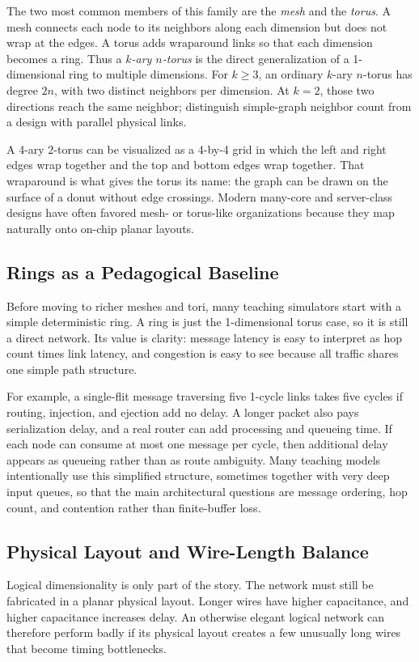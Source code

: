 The two most common members of this family are the \textit{mesh} and the \textit{torus}.
A mesh connects each node to its neighbors along each dimension but does not wrap at the edges.
A torus adds wraparound links so that each dimension becomes a ring.
Thus a \textit{$k$-ary $n$-torus} is the direct generalization of a 1-dimensional ring to multiple dimensions.
For $k\ge3$, an ordinary $k$-ary $n$-torus has degree $2n$, with two distinct neighbors per dimension.
At $k=2$, those two directions reach the same neighbor; distinguish simple-graph neighbor count from a design with parallel physical links.

A 4-ary 2-torus can be visualized as a 4-by-4 grid in which the left and right edges wrap together and the top and bottom edges wrap together.
That wraparound is what gives the torus its name: the graph can be drawn on the surface of a donut without edge crossings.
Modern many-core and server-class designs have often favored mesh- or torus-like organizations because they map naturally onto on-chip planar layouts.

\subsection{Rings as a Pedagogical Baseline}\label{subsec:pin-rings}
Before moving to richer meshes and tori, many teaching simulators start with a simple deterministic ring.
A ring is just the 1-dimensional torus case, so it is still a direct network.
Its value is clarity: message latency is easy to interpret as hop count times link latency, and congestion is easy to see because all traffic shares one simple path structure.

For example, a single-flit message traversing five 1-cycle links takes five cycles if routing, injection, and ejection add no delay.
A longer packet also pays serialization delay, and a real router can add processing and queueing time.
If each node can consume at most one message per cycle, then additional delay appears as queueing rather than as route ambiguity.
Many teaching models intentionally use this simplified structure, sometimes together with very deep input queues, so that the main architectural questions are message ordering, hop count, and contention rather than finite-buffer loss.

\subsection{Physical Layout and Wire-Length Balance}\label{subsec:pin-layout}
Logical dimensionality is only part of the story.
The network must still be fabricated in a planar physical layout.
Longer wires have higher capacitance, and higher capacitance increases delay.
An otherwise elegant logical network can therefore perform badly if its physical layout creates a few unusually long wires that become timing bottlenecks.

